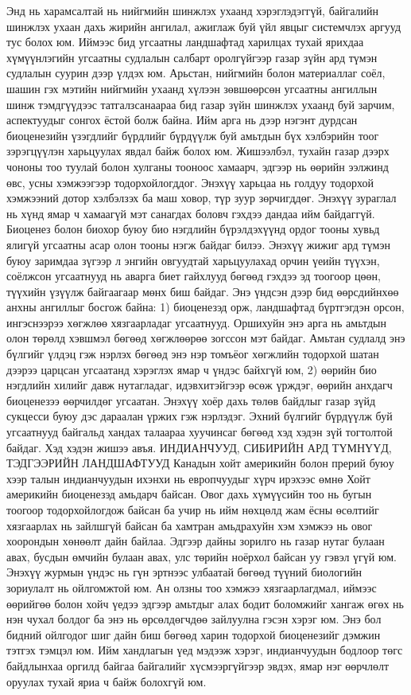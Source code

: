 Энд нь харамсалтай нь нийгмийн шинжлэх ухаанд хэрэглэдэггүй, байгалийн шинжлэх ухаан дахь жирийн ангилал, ажиглаж буй үйл явцыг системчлэх аргууд тус болох юм. Иймээс бид угсаатны ландшафтад харилцах тухай ярихдаа хүмүүнлэгийн угсаатны судлалын салбарт оролгүйгээр газар зүйн ард түмэн судлалын суурин дээр үлдэх юм.
Арьстан, нийгмийн болон материаллаг соёл, шашин гэх мэтийн нийгмийн ухаанд хүлээн зөвшөөрсөн угсаатны ангиллын шинж тэмдгүүдээс татгалзсанаараа бид газар зүйн шинжлэх ухаанд буй зарчим, аспектуудыг сонгох ёстой болж байна. Ийм арга нь дээр нэгэнт дурдсан биоценезийн үзэгдлийг бүрдлийг бүрдүүлж буй амьтдын бүх хэлбэрийн тоог зэрэгцүүлэн харьцуулах явдал байж болох юм. Жишээлбэл, тухайн газар дээрх чононы тоо туулай болон хулганы тооноос хамаарч, эдгээр нь өөрийн ээлжинд өвс, усны хэмжээгээр тодорхойлогддог. Энэхүү харьцаа нь голдуу тодорхой хэмжээний дотор хэлбэлзэх ба маш ховор, түр зуур зөрчигддөг.
Энэхүү зураглал нь хүнд ямар ч хамаагүй мэт санагдах боловч гэхдээ дандаа ийм байдаггүй. Биоценез болон биохор буюу био нэгдлийн бүрэлдэхүүнд ордог тооны хувьд ялигүй угсаатны асар олон тооны нэгж байдаг билээ. Энэхүү жижиг ард түмэн буюу заримдаа зүгээр л энгийн овгуудтай харьцуулахад орчин үеийн түүхэн, соёлжсон угсаатнууд нь аварга биет гайхлууд бөгөөд гэхдээ эд тоогоор цөөн, түүхийн үзүүлж байгаагаар мөнх биш байдаг. Энэ үндсэн дээр бид өөрсдийнхөө анхны ангиллыг босгож байна: 1) биоценезэд орж, ландшафтад бүртгэгдэн орсон, ингэснээрээ хөгжлөө хязгаарладаг угсаатнууд. Оршихуйн энэ арга нь амьтдын олон төрөлд хэвшмэл бөгөөд хөгжлөөрөө зогссон мэт байдаг. Амьтан судлалд энэ бүлгийг үлдэц гэж нэрлэх бөгөөд энэ нэр томъёог хөгжлийн тодорхой шатан дээрээ царцсан угсаатанд хэрэглэх ямар ч үндэс байхгүй юм, 2) өөрийн био нэгдлийн хилийг давж нутагладаг, идэвхитэйгээр өсөж үрждэг, өөрийн анхдагч биоценезээ өөрчилдөг угсаатан. Энэхүү хоёр дахь төлөв байдлыг газар зүйд сукцесси буюу дэс дараалан үржих гэж нэрлэдэг.
Эхний бүлгийг бүрдүүлж буй угсаатнууд байгальд хандах талаараа хуучинсаг бөгөөд хэд хэдэн зүй тогтолтой байдаг. Хэд хэдэн жишээ авъя.
ИНДИАНЧУУД, СИБИРИЙН АРД ТҮМНҮҮД, ТЭДГЭЭРИЙН ЛАНДШАФТУУД
Канадын хойт америкийн болон прерий буюу хээр талын индианчуудын ихэнхи нь европчуудыг хүрч ирэхээс өмнө Хойт америкийн биоценезэд амьдарч байсан. Овог дахь хүмүүсийн тоо нь бугын тоогоор тодорхойлогдож байсан ба учир нь ийм нөхцөлд жам ёсны өсөлтийг хязгаарлах нь зайлшгүй байсан ба хамтран амьдрахуйн хэм хэмжээ нь овог хоорондын хөнөөлт дайн байлаа. Эдгээр дайны зорилго нь газар нутаг булаан авах, бусдын өмчийн булаан авах, улс төрийн ноёрхол байсан уу гэвэл үгүй юм. Энэхүү журмын үндэс нь гүн эртнээс улбаатай бөгөөд түүний биологийн зориулалт нь ойлгомжтой юм. Ан олзны тоо хэмжээ хязгаарлагдмал, иймээс өөрийгөө болон хойч үедээ эдгээр амьтдыг алах бодит боломжийг хангаж өгөх нь нэн чухал болдог ба энэ нь өрсөлдөгчдөө зайлуулна гэсэн хэрэг юм. Энэ бол бидний ойлгодог шиг дайн биш бөгөөд харин тодорхой биоценезийг дэмжин тэтгэх тэмцэл юм. Ийм хандлагын үед мэдээж хэрэг, индианчуудын бодлоор төгс байдлынхаа оргилд байгаа байгалийг хүсмээргүйгээр эвдэх, ямар нэг өөрчлөлт оруулах тухай яриа ч байж болохгүй юм.
